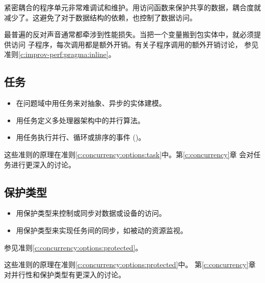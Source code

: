 \begin{blockindent}
紧密耦合的程序单元非常难调试和维护。用访问函数来保护共享的数据，耦合度就
减少了。这避免了对于数据结构的依赖，也控制了数据访问。
\end{blockindent}

\begin{blockindent}
最普遍的反对声音通常都牵涉到性能损失。当把一个变量搬到包实体中，就必须提供访问
子程序，每次调用都是额外开销。有关子程序调用的额外开销讨论，
参见准则\ref{c:improv-perf:pragma:inline}。
\end{blockindent}

\subsection{任务}
\begin{itemize}
\item 在问题域中用任务来对抽象、异步的实体建模。
\item 用任务定义多处理器架构中的并行算法。
\item 用任务执行并行、循环或排序的事件 (\cite{nasa87})。
\end{itemize}

\begin{blockindent}
这些准则的原理在准则\ref{c:concurrency:options:task}中。第\ref{c:concurrency}章
会对任务进行更深入的讨论。
\end{blockindent}


\subsection{保护类型}
\begin{itemize}
\item 用保护类型来控制或同步对数据或设备的访问。
\item 用保护类型来实现任务间的同步，如被动的资源监视。
\end{itemize}

\begin{blockindent}
参见准则\ref{c:concurrency:options:protected}。
\end{blockindent}

\begin{blockindent}
这些准则的原理在准则\ref{c:concurrency:options:protected}中。
第\ref{c:concurrency}章对并行性和保护类型有更深入的讨论。
\end{blockindent}
